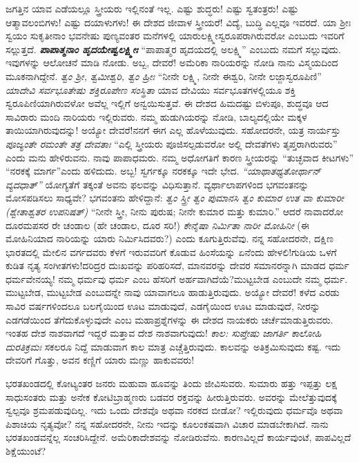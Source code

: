 ಜಗತ್ತಿನ ಯಾವ ಎಡೆಯಲ್ಲೂ ಸ್ತ್ರೀಯರು ಇಲ್ಲಿನಂತೆ ಇಲ್ಲ. ಎಷ್ಟು ಶುದ್ಧರು! ಎಷ್ಟು ಸ್ವತಂತ್ರರು! ಎಷ್ಟು ಆತ್ಮಾವಲಂಬಿಗಳು! ಎಷ್ಟು ದಯಾಳುಗಳು! ಈ ದೇಶದ ಜೀವಾಳ ಸ್ತ್ರೀಯರೆ! ವಿದ್ಯೆ, ಬುದ್ಧಿ ಎಲ್ಲವೂ ಇವರದೆ. ಯಾ ಶ‍್ರೀಃ ಸ್ವಯಂ ಸುಕೃತೀನಾಂ ಭವನೇಷು ಪುಣ್ಯವಂತರ ಮನೆಗಳಲ್ಲಿ ಯಾರುಲಕ್ಷ್ಮೀಸ್ವರೂಪರಾಗಿರುವರೋ ಎಂಬುದು ಇವರಿಗೆ ಸಲ್ಲುತ್ತದೆ. \textbf{\textit{ಪಾಪಾತ್ಮನಾಂ ಹೃದಯೇಷ್ವಲಕ್ಷ್ಮೀಃ}} “ಪಾಪಾತ್ಮರ ಹೃದಯದಲ್ಲಿ ಅಲಕ್ಷ್ಮಿ” ಎಂಬುದು ನಮಗೆ ಸಲ್ಲುವುದು. ಇವುಗಳನ್ನು ಆಲೋಚನೆ ಮಾಡಿ ನೋಡು. ಅಬ್ಬ, ದೇವರೆ! ಅಮೆರಿಕಾ ನಾರಿಯರನ್ನು ನೋಡಿ ನಾನು ವಿಸ್ಮಯದಿಂದ ಮೂಕನಾಗಿದ್ದೇನೆ. \textit{ತ್ವಂ ಶ‍್ರೀ, ತ್ವಮೀಶ್ವರಿ, ತ್ವಂ ಹ್ರೀಃ} “ನೀನೇ ಲಕ್ಷ್ಮಿ, ನೀನೇ ಈಶ್ವರಿ, ನೀನೇ ಲಜ್ಜಾಸ್ವರೂಪಿಣಿ” \textit{ಯಾದೇವಿ ಸರ್ವಭೂತೇಷು ಶಕ್ತಿರೂಪೇಣ ಸಂಸ್ಥಿತಾ} ಯಾವ ದೇವಿಯು ಸರ್ವಭೂತಗಳಲ್ಲಿಯೂ ಶಕ್ತಿ ಸ್ವರೂಪಿಣಿಯಾಗಿರುವಳೋ \enginline{-} ಅವೆಲ್ಲ ಇಲ್ಲಿಗೆ ಅನ್ವಯಿಸುತ್ತವೆ. ಈ ದೇಶದ ಹಿಮದಷ್ಟು ಬಿಳುಪೂ, ಶುದ್ಧವೂ ಆದ ಸಾವಿರಾರು ಮಂದಿ ನಾರಿಯರು ಇಲ್ಲಿರುವರು. ನಮ್ಮ ಹುಡುಗಿಯರನ್ನು ನೋಡಿ, ಬಾಲ್ಯದಲ್ಲಿಯೇ ಮಕ್ಕಳ ತಾಯಿಯಾಗಿರುವುದನ್ನು! ಅಯ್ಯೋ ದೇವರೆ!ನನಗೆ ಈಗ ಎಲ್ಲ ಹೊಳೆಯುವುದು. ಸಹೋದರನೇ, ಯತ್ರ ನಾರ್ಯಸ್ತು \textit{ಪೂಜ್ಯಂತೇ ರಮಂತೇ ತತ್ರ ದೇವತಾಃ} “ಎಲ್ಲಿ ಸ್ತ್ರೀಯರು ಪೂಜಿಸಲ್ಪಡುವರೋ ಅಲ್ಲಿ ದೇವತೆಗಳು ತೃಪ್ತರಾಗಿರುವರು” ಎಂದು ಮನು ಹೇಳಿರುವನು. ನಾವು ಪಾಪಾಧಮರು. ನಮ್ಮ ಅಧೋಗತಿಗೆ ಕಾರಣ ಸ್ತ್ರೀಯರನ್ನು “ತುಚ್ಛವಾದ ಕೀಟಗಳು” “ನರಕಕ್ಕೆ ಮಾರ್ಗ”ಎಂದು ಹಳಿದುದು. ಅಬ್ಬ! ಸ್ವರ್ಗಕ್ಕೂ ನರಕಕ್ಕೂ ಇದೇ ಭೇದ. \textit{ “ಯಾಥಾತಥ್ಯತೋರ್ಥಾನ್ ವ್ಯದಧಾತ್”} ಯೋಗ್ಯತೆಗೆ ತಕ್ಕಂತೆ ಅವನು ಫಲವನ್ನು ವಿಧಿಸುತ್ತಾನೆ. ವ್ಯರ್ಥಾಲಾಪಗಳಿಂದ ಭಗವಂತನನ್ನು ಮೋಸಪಡಿಸಲು ಸಾಧ್ಯವೇ? ಭಗವಂತನು ಹೇಳಿದ್ದಾನೆ: \textit{ತ್ವಂ ಸ್ತ್ರೀ ತ್ವಂ ಪುಮಾನಸಿ ತ್ವಂ ಕುಮಾರ ಉತ ವಾ ಕುಮಾರೀ (ಶ್ವೇತಾಶ್ವತರ ಉಪನಿಷತ್)} “ನೀನೇ ಸ್ತ್ರೀ, ನೀನು ಪುರುಷ; ನೀನೇ ಕುಮಾರ ಮತ್ತು ಕುಮಾರಿ.” ಆದರೆ ನಾವಾದರೋ ದೂರಮಪಸರ ರೇ ಚಂಡಾಲ (ಹೇ ಚಂಡಾಲ, ದೂರ ಸರಿ!) \textit{ಕೇನೈಷಾ ನಿರ್ಮಿತಾ ನಾರೀ ಮೋಹಿನೀ} (ಈ ಮೋಹಿನಿಯಾದ ನಾರಿಯನ್ನು ಯಾರು ನಿರ್ಮಿಸಿದವರು?) ಎಂದು ಕೂಗುತ್ತಿರುವೆವು. ನನ್ನ ಸಹೋದರನೇ, ದಕ್ಷಿಣ ಭಾರತದಲ್ಲಿ ಮೇಲಿನ ವರ್ಗದವರು ಕೆಳಗೆ ಇರುವವರಿಗೆ ಕೊಡುವ ಹಿಂಸೆಯನ್ನು ಏನೆಂದು ಹೇಳಲಿ!ಗುಡಿಯ ಒಳಗೆ ಕುಡಿತ ನೃತ್ಯ ಸಂಗೀತಗಳು!ದರಿದ್ರರ ದುಃಖವನ್ನು ಪರಿಹರಿಸದೆ, ಮಾನವರನ್ನು ದೇವರ ಸಮಾನರನ್ನಾಗಿ ಮಾಡದ ಧರ್ಮ ಧರ್ಮವೇನಯ್ಯ! ನಮ್ಮ ಧರ್ಮವು ಧರ್ಮ ಎಂಬ ಹೆಸರಿಗೆ ಅರ್ಹವಾಗಿದೆಯೆ?ಮುಟ್ಟಬೇಡ ಎಂಬುದೇ ನಮ್ಮ ಧರ್ಮ. ಮುಟ್ಟಬೇಡ, ಮುಟ್ಟಬೇಡ ಎಂಬುದನ್ನೇ ನಾವು ಯಾವಾಗಲೂ ಹಾಡುತ್ತಿರುವುದು. ಅಯ್ಯೋ ದೇವರೆ! ಕಳೆದ ಎರಡು ಸಾವಿರ ವರ್ಷಗಳಿಂದಲೂ ಬಲಗೈಯಿಂದ ಊಟ ಮಾಡುವುದೆ, ಎಡಗೈಯಿಂದ ಊಟ ಮಾಡುವುದೆ, ನೀರನ್ನು ಎಡಗಡೆಯಿಂದ ತೆಗೆದುಕೊಳ್ಳುವುದೇ ಎಂಬ ಮಹಾಪ್ರಶ್ನೆಗಳನ್ನು ಈ ದೇಶದ ನಾಯಕರು ಚರ್ಚೆಮಾಡುತ್ತಿರುವರು. ಇಂತಹ ದೇಶ ನಾಶವಾಗದೆ ಇದ್ದರೆ ಮತ್ತಾವ ದೇಶ ನಾಶವಾಗುವುದು! \textit{ಕಾಲ: ಸುಪ್ತೇಷು ಜಾಗರ್ತಿ ಕಾಲೋಹಿ ದುರತಿಕ್ರಮಃ} ಸಕಲರೂ ನಿದ್ದೆ ಮಾಡುವಾಗ ಕಾಲ ಮಾತ್ರ ಎಚ್ಚೆತ್ತಿರುವುದು. ಕಾಲವನ್ನು ಅತಿಕ್ರಮಿಸುವುದು ಕಷ್ಟ. ಇದು ದೇವರಿಗೆ ಗೊತ್ತು, ಅವನ ಕಣ್ಣಿಗೆ ಯಾರು ಮಣ್ಣು ಹಾಕುವವರು!

ಭರತಖಂಡದಲ್ಲಿ ಕೋಟ್ಯಂತರ ಜನರು ಮಹುವಾ ಹೂವನ್ನು ತಿಂದು ಜೀವಿಸುವರು. ಸುಮಾರು ಹತ್ತು ಇಪ್ಪತ್ತು ಲಕ್ಷ ಸಾಧುಸಂತರು ಮತ್ತು ಅನೇಕ ಕೋಟಿಬ್ರಾಹ್ಮಣರು ಬಡವರ ರಕ್ತವನ್ನು ಹೀರುತ್ತಿರುವರು. ಅವರನ್ನು ಮೇಲೆತ್ತುವುದಕ್ಕೆ ಸ್ವಲ್ಪವೂ ಶ್ರಮಪಡುವುದಿಲ್ಲ. ಇದು ಒಂದು ದೇಶವೊ ಅಥವಾ ನರಕದ ಬೀಡೋ? ಇಲ್ಲಿರುವುದು ಧರ್ಮವೊ ಅಥವಾ ಪಿಶಾಚಿಯ ನೃತ್ಯವೋ? ನನ್ನ ಸಹೋದರನೇ, ನೀನು ಇದನ್ನು ಕೂಲಂಕಷವಾಗಿ ವಿಚಾರ ಮಾಡಬೇಕಾಗಿದೆ. ನಾನು ಭರತಖಂಡವನ್ನೆಲ್ಲ ಸಂಚರಿಸಿದ್ದೇನೆ. ಅಮೆರಿಕಾದೇಶವನ್ನು ನೋಡಿರುವೆನು. ಕಾರಣವಿಲ್ಲದೆ ಕಾರ್ಯವುಂಟೆ, ಪಾಪವಿಲ್ಲದೆ ಶಿಕ್ಷೆಯುಂಟೆ?

